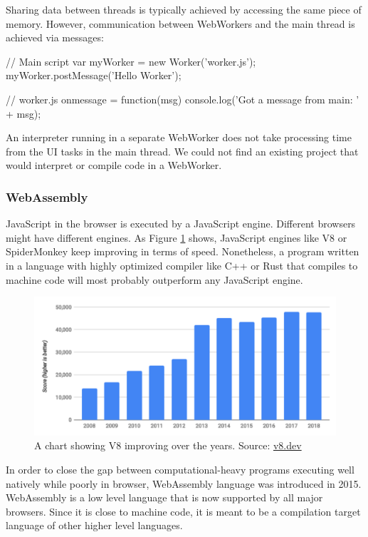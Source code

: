 Sharing data between threads is typically achieved by accessing the same piece of memory. However, communication between WebWorkers and the main
thread is achieved via messages:
\begin{code}
// Main script
var myWorker = new Worker('worker.js');
myWorker.postMessage('Hello Worker');

// worker.js
onmessage = function(msg) {
  console.log('Got a message from main: ' + msg);
}
\end{code}

An interpreter running in a separate WebWorker does not take processing time from the UI tasks in the main thread. We could not find an existing
project that would interpret or compile code in a WebWorker.

\subsubsection{WebAssembly}
JavaScript in the browser is executed by a JavaScript engine. Different browsers might have different engines. As Figure \ref{fig:chap2:v8_bench} shows,
JavaScript engines like V8 or SpiderMonkey keep improving in terms of speed. Nonetheless, a program written in a language
with highly optimized compiler like C++ or Rust that compiles to machine code will most probably outperform any JavaScript engine.

\begin{figure}[!hbt]
	\includegraphics[width=\textwidth]{../img/v8-bench}
	\caption{A chart showing V8 improving over the years. Source: \href{https://v8.dev/blog/10-years}{v8.dev}}
	\label{fig:chap2:v8_bench}
\end{figure}

In order to close the gap between computational-heavy programs executing well natively while poorly in browser, WebAssembly
language was introduced in 2015. WebAssembly is a low level language that is now supported by all major browsers. Since it is
close to machine code, it is meant to be a compilation target language of other higher level languages.


